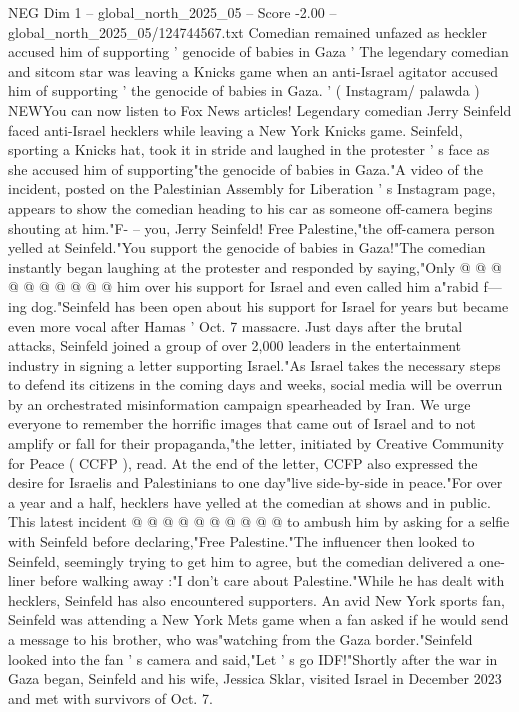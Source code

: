 \begin{textsample}{NEG Dim 1 – global\_north\_2025\_05 – Score -2.00 – global\_north\_2025\_05/124744567.txt}  \label{ex:f1_neg_229}
Comedian remained unfazed as heckler accused him of supporting ' genocide of babies in Gaza ' The legendary comedian and sitcom star was leaving a Knicks game when an anti-Israel agitator accused him of supporting ' the genocide of babies in Gaza. ' ( Instagram/ palawda ) NEWYou can now listen to Fox News articles!
Legendary comedian Jerry Seinfeld faced anti-Israel hecklers while leaving a New York Knicks game.
Seinfeld, sporting a Knicks hat, took it in stride and laughed in the protester ' s face as she accused him of supporting"the genocide of babies in Gaza."A video of the incident, posted on the Palestinian Assembly for Liberation ' s Instagram page, appears to show the comedian heading to his car as someone off-camera begins shouting at him."F- -- you, Jerry Seinfeld!
Free Palestine,"the off-camera person yelled at Seinfeld."You support the genocide of babies in Gaza!"The comedian instantly began laughing at the protester and responded by saying,"Only @ @ @ @ @ @ @ @ @ @ him over his support for Israel and even called him a"rabid f---ing dog."Seinfeld has been open about his support for Israel for years but became even more vocal after Hamas ' Oct. 7 massacre.
Just days after the brutal attacks, Seinfeld joined a group of over 2,000 leaders in the entertainment industry in signing a letter supporting Israel."As Israel takes the necessary steps to defend its citizens in the coming days and weeks, social media will be overrun by an orchestrated misinformation campaign spearheaded by Iran.
We urge everyone to remember the horrific images that came out of Israel and to not amplify or fall for their propaganda,"the letter, initiated by Creative Community for Peace ( CCFP ), read.
At the end of the letter, CCFP also expressed the desire for Israelis and Palestinians to one day"live side-by-side in peace."For over a year and a half, hecklers have yelled at the comedian at shows and in public.
This latest incident @ @ @ @ @ @ @ @ @ @ to ambush him by asking for a selfie with Seinfeld before declaring,"Free Palestine."The influencer then looked to Seinfeld, seemingly trying to get him to agree, but the comedian delivered a one-liner before walking away :"I don't care about Palestine."While he has dealt with hecklers, Seinfeld has also encountered supporters.
An avid New York sports fan, Seinfeld was attending a New York Mets game when a fan asked if he would send a message to his brother, who was"watching from the Gaza border."Seinfeld looked into the fan ' s camera and said,"Let ' s go IDF!"Shortly after the war in Gaza began, Seinfeld and his wife, Jessica Sklar, visited Israel in December 2023 and met with survivors of Oct. 7.

\end{textsample}
